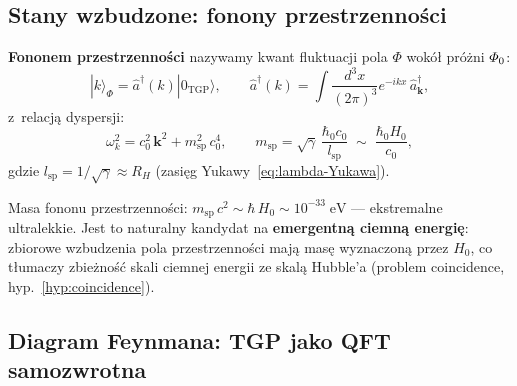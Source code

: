 \subsection{Stany wzbudzone: fonony przestrzenności}%
\label{app:E-phonons}

\begin{definition}\label{def:phonon}
\textbf{Fononem przestrzenności} nazywamy kwant fluktuacji
pola $\Phi$ wokół próżni $\varPhi_0$:
\begin{equation}\label{eq:phonon-state}
    |k\rangle_\Phi = \hat{a}^\dagger(k)|0_{\mathrm{TGP}}\rangle,
    \qquad
    \hat{a}^\dagger(k) = \int \frac{d^3x}{(2\pi)^3}
    e^{-ikx}\,\hat{a}^\dagger_{\mathbf{k}},
\end{equation}
z~relacją dyspersji:
\begin{equation}\label{eq:phonon-dispersion}
    \omega_k^2 = c_0^2\,\mathbf{k}^2 + m_{\mathrm{sp}}^2\,c_0^4,
    \qquad
    m_{\mathrm{sp}} = \sqrt{\gamma}\,\frac{\hbar_0 c_0}{l_{\mathrm{sp}}}
    \;\sim\; \frac{\hbar_0 H_0}{c_0},
\end{equation}
gdzie $l_{\mathrm{sp}} = 1/\sqrt{\gamma} \approx R_H$
(zasięg Yukawy~\ref{eq:lambda-Yukawa}).
\end{definition}

\begin{remark}
Masa fononu przestrzenności:
$m_{\mathrm{sp}}\,c^2 \sim \hbar\,H_0 \sim 10^{-33}\;\mathrm{eV}$
--- ekstremalne ultralekkie. Jest to naturalny kandydat na
\textbf{emergentną ciemną energię}: zbiorowe wzbudzenia
pola przestrzenności mają masę wyznaczoną przez $H_0$,
co tłumaczy zbieżność skali ciemnej energii ze skalą Hubble'a
(problem coincidence, hyp.~\ref{hyp:coincidence}).
\end{remark}

\subsection{Diagram Feynmana: TGP jako QFT samozwrotna}%
\label{app:E-feynman}

